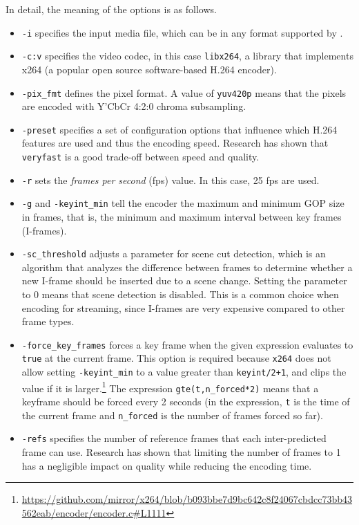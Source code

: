 In detail, the meaning of the options is as follows.

\begin{itemize}
    \item \texttt{-i} specifies the input media file, which can be in any format supported by \ffmpeg{}.
    \item \texttt{-c:v} specifies the video codec, in this case \texttt{libx264}, a library that implements x264 (a popular open source software-based H.264 encoder).
    \item \texttt{-pix\_fmt} defines the pixel format. A value of \texttt{yuv420p} means that the pixels are encoded with Y'CbCr 4:2:0 chroma subsampling.
    \item \texttt{-preset} specifies a set of configuration options that influence which H.264 features are used and thus the encoding speed. Research has shown that \texttt{veryfast} is a good trade-off between speed and quality.\cite{ozer}
    \item \texttt{-r} sets the \textit{frames per second} (fps) value. In this case, 25 fps are used.
    \item \texttt{-g} and \texttt{-keyint\_min} tell the encoder the maximum and minimum GOP size in frames, that is, the minimum and maximum interval between key frames (I-frames).
    \item \texttt{-sc\_threshold} adjusts a parameter for scene cut detection, which is an algorithm that analyzes the difference between frames to determine whether a new I-frame should be inserted due to a scene change. Setting the parameter to 0 means that scene detection is disabled. This is a common choice when encoding for streaming, since I-frames are very expensive compared to other frame types.\cite{ozer}
    \item \texttt{-force\_key\_frames} forces a key frame when the given expression evaluates to \texttt{true} at the current frame. This option is required because \texttt{x264} does not allow setting \texttt{-keyint\_min} to a value greater than \texttt{keyint/2+1}, and clips the value if it is larger.\footnote{\url{https://github.com/mirror/x264/blob/b093bbe7d9bc642c8f24067cbdcc73bb43562eab/encoder/encoder.c\#L1111}} The expression \texttt{gte(t,n\_forced*2)} means that a keyframe should be forced every 2 seconds (in the expression, \texttt{t} is the time of the current frame and \texttt{n\_forced} is the number of frames forced so far).
    \item \texttt{-refs} specifies the number of reference frames that each inter-predicted frame can use. Research has shown that limiting the number of frames to 1 has a negligible impact on quality while reducing the encoding time.\cite{ozer}

\end{itemize}
